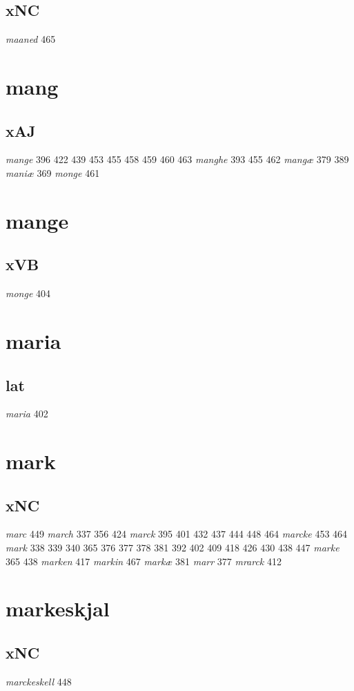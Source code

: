 \documentclass[a4paper,twocolumn]{article}
\begin{document}
\subsection{xNC}
\label{sec:org7b973ef}
\emph{maaned} 465 
\section{mang}
\label{sec:orge971c51}
\subsection{xAJ}
\label{sec:org67de22c}
\emph{mange} 396 422 439 453 455 458 459 460 463 \emph{manghe} 393 455 462 \emph{mangæ} 379 389 \emph{maniæ} 369 \emph{monge} 461 
\section{mange}
\label{sec:org0ec28f5}
\subsection{xVB}
\label{sec:org7f2d5ab}
\emph{monge} 404 
\section{maria}
\label{sec:org1b94868}
\subsection{lat}
\label{sec:org23bc3d5}
\emph{maria} 402 
\section{mark}
\label{sec:org178edd1}
\subsection{xNC}
\label{sec:org4333d16}
\emph{marc} 449 \emph{march} 337 356 424 \emph{marck} 395 401 432 437 444 448 464 \emph{marcke} 453 464 \emph{mark} 338 339 340 365 376 377 378 381 392 402 409 418 426 430 438 447 \emph{marke} 365 438 \emph{marken} 417 \emph{markin} 467 \emph{markæ} 381 \emph{marr} 377 \emph{mrarck} 412 
\section{markeskjal}
\label{sec:orge0c43d9}
\subsection{xNC}
\label{sec:org7eb9759}
\emph{marckeskell} 448 
\end{document}

